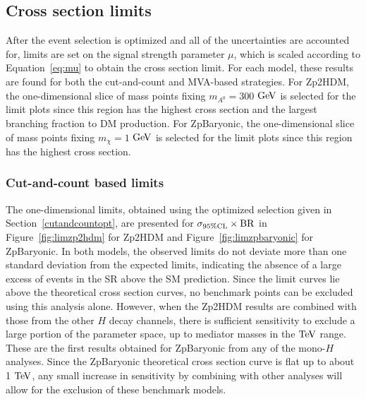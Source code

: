 \subsection{Cross section limits}

After the event selection is optimized and all of the uncertainties are accounted for, limits are set on the signal strength parameter $\mu$, which is scaled according to Equation~\ref{eq:mu} to obtain the cross section limit. For each model, these results are found for both the cut-and-count and MVA-based strategies. For Zp2HDM, the one-dimensional slice of mass points fixing $m_{A^0} = 300$ $\mathrm{Ge\kern -0.1em V}$ is selected for the limit plots since this region has the highest cross section and the largest branching fraction to DM production. For ZpBaryonic, the one-dimensional slice of mass points fixing $m_{\chi} = 1$ $\mathrm{Ge\kern -0.1em V}$ is selected for the limit plots since this region has the highest cross section.

\subsubsection{Cut-and-count based limits}

The one-dimensional limits, obtained using the optimized selection given in Section~\ref{cutandcountopt}, are presented for $\sigma_{95\% \rm{CL}}\times \rm{BR}$ in Figure~\ref{fig:limzp2hdm} for Zp2HDM and Figure~\ref{fig:limzpbaryonic} for ZpBaryonic. In both models, the observed limits do not deviate more than one standard deviation from the expected limits, indicating the absence of a large excess of events in the SR above the SM prediction. Since the limit curves lie above the theoretical cross section curves, no benchmark points can be excluded using this analysis alone. However, when the Zp2HDM results are combined with those from the other $H$ decay channels, there is sufficient sensitivity to exclude a large portion of the parameter space, up to mediator masses in the $\mathrm{Te\kern -0.1em V}$ range. These are the first results obtained for ZpBaryonic from any of the mono-$H$ analyses. Since the ZpBaryonic theoretical cross section curve is flat up to about 1 $\mathrm{Te\kern -0.1em V}$, any small increase in sensitivity by combining with other analyses will allow for the exclusion of these benchmark models. 

